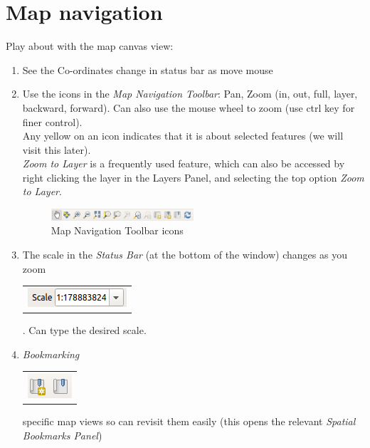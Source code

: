 \chapter{Map navigation}

\pagestyle{fancy}
\fancyhf{}
\fancyhead[OC]{\leftmark}
\fancyhead[EC]{\rightmark}
\cfoot{\thepage}


Play about with the map canvas view:
\begin{enumerate}[~~~1)]
	\item
	See the Co-ordinates change in status bar as move mouse
	\item
	Use the icons in the \textit{Map Navigation Toolbar}: Pan, Zoom (in, out, full, layer, backward, forward). Can also use the mouse wheel to zoom (use ctrl key for finer control).\\
	Any yellow on an icon indicates that it is about selected features (we will visit this later).\\ %
	\textit{Zoom to Layer} is a frequently used feature, which can also be accessed by right clicking the layer in the Layers Panel, and selecting the top option \textit{Zoom to Layer}.
	\begin{figure}[!h]
		\centering
		\includegraphics[width=0.5\textwidth]{images/map_navigation_toolbar_icons.png}
		\caption{Map Navigation Toolbar icons}
		\label{ft_fig_firstfig3}
	\end{figure}
	\item 
	The scale in the \textit{Status Bar} (at the bottom of the window) changes as you zoom 
	\begin{tabular}{@{}c@{}}\includegraphics[width=8ex]{images/scale_status_bar.png}\end{tabular}
	. Can type the desired scale.
	\item
	\textit{Bookmarking} 
	\begin{tabular}{@{}c@{}}\includegraphics[width=4ex]{images/bookmark_icons.png}\end{tabular}
	specific map views so can revisit them easily (this opens the relevant \textit{Spatial Bookmarks Panel})
	\begin{figure}[!h]

\end{figure}
\end{enumerate}
